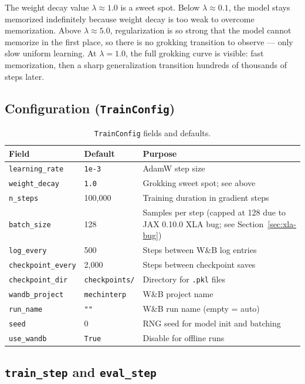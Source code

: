 \documentclass[11pt, a4paper]{article}
\begin{document}
The weight decay value $\lambda \approx 1.0$ is a sweet spot. Below
$\lambda \approx 0.1$, the model stays memorized indefinitely because weight
decay is too weak to overcome memorization. Above $\lambda \approx 5.0$,
regularization is so strong that the model cannot memorize in the first place,
so there is no grokking transition to observe --- only slow uniform learning.
At $\lambda = 1.0$, the full grokking curve is visible: fast memorization,
then a sharp generalization transition hundreds of thousands of steps later.

\subsection{Configuration (\texttt{TrainConfig})}

\begin{table}[H]
\centering
\begin{tabular}{@{}llp{7cm}@{}}
\toprule
Field & Default & Purpose \\
\midrule
\texttt{learning\_rate} & \texttt{1e-3} & AdamW step size \\
\texttt{weight\_decay}  & \texttt{1.0}  & Grokking sweet spot; see above \\
\texttt{n\_steps}       & 100{,}000     & Training duration in gradient steps \\
\texttt{batch\_size}    & 128           & Samples per step (capped at 128 due to JAX 0.10.0 XLA bug; see Section~\ref{sec:xla-bug}) \\
\texttt{log\_every}     & 500           & Steps between W\&B log entries \\
\texttt{checkpoint\_every} & 2{,}000   & Steps between checkpoint saves \\
\texttt{checkpoint\_dir} & \texttt{checkpoints/} & Directory for \texttt{.pkl} files \\
\texttt{wandb\_project} & \texttt{mechinterp} & W\&B project name \\
\texttt{run\_name}      & \texttt{""} & W\&B run name (empty = auto) \\
\texttt{seed}           & 0             & RNG seed for model init and batching \\
\texttt{use\_wandb}     & \texttt{True} & Disable for offline runs \\
\bottomrule
\end{tabular}
\caption{\texttt{TrainConfig} fields and defaults.}
\end{table}

\subsection{\texttt{train\_step} and \texttt{eval\_step}}
\end{document}
